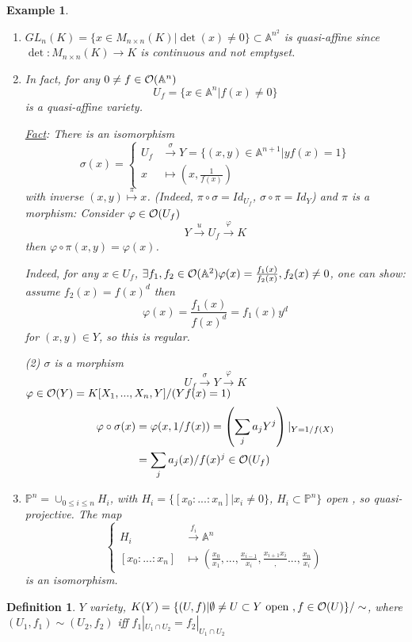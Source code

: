 \documentclass[11pt]{article}
\newtheorem{dfn}[thm]{Definition}
\newtheorem{ex}[thm]{Example}
\newcommand{\affn}{\mathbb A}
\newcommand{\proj}{\mathbb P}
\newcommand{\calo}{{\cal O}}
\newcommand{\lrta}{\longrightarrow}
\begin{document}
\begin{ex}\ 
\begin{enumerate}
\item $GL_n(K)=\{x\in M_{n\times n}(K)|\det(x)\neq 0\}\subset \affn^{n^2}$ is quasi-affine since $\det:M_{n\times n}(K)\lrta K$ is continuous and not emptyset.

\item In fact, for any $0\neq f\in \calo(\affn^n)$
$$
U_f=\{x\in \affn^n|f(x)\neq 0\}
$$
is a quasi-affine variety.

\underline{Fact}: There is an isomorphism
$$
\sigma(x) = 
\left\{\begin{aligned}
U_f&\overset{\sigma}{\lrta} Y=\{(x,y)\in\affn^{n+1}|yf(x)=1\}\\
x&\longmapsto \left(x,\frac{1}{f(x)}\right)
\end{aligned}
\right.
$$
with inverse
$(x,y)\overset{\pi}{\longmapsto}x$.
(Indeed, $\pi\circ \sigma=Id_{U_f}$, $\sigma\circ \pi=Id_Y$) and $\pi$ is a morphism: Consider $\varphi\in\calo(U_f)$
$$
Y\overset{u}{\lrta}U_f\overset{\varphi}{\lrta}K
$$
then $\varphi\circ \pi(x,y)=\varphi(x)$.

Indeed, for any $x\in U_f$, $\exists f_1,f_2\in \calo(\affn^2)\varphi(x)=\frac{f_1(x)}{f_2(x)}, f_2(x)\neq 0$, one can show: assume $f_2(x)=f(x)^d$ then 
$$
\varphi(x)=\frac{f_1(x)}{f(x)^d}=f_1(x)y^d
$$
for $(x,y)\in Y$, so this is regular.

(2) $\sigma$ is a morphism
$$
U_f\overset{\sigma}{\lrta}Y\overset{\varphi}{\lrta}K
$$
$\varphi\in\calo(Y)=K[X_1,...,X_n,Y]/(Yf(x)=1)$
$$
\begin{aligned}
\varphi\circ \sigma(x)&=\varphi(x,1/f(x))=\left(\sum_j a_j Y^j\right)|_{Y=1/f(X)}\\
&=\sum_j a_j (x)/f(x)^j\in \calo(U_f)
\end{aligned}
$$
\item $\proj^n=\cup_{0\leq i\leq n}H_i$, with $H_i=\{[x_0:...:x_n]|x_{i}\neq 0\}$, $H_i\subset \proj^n\}$ open , so quasi-projective. The map
$$
\left\{\begin{aligned}
H_i&\overset{f_i}{\lrta} \affn^n\\
[x_0:...:x_n]&\longmapsto (\frac{x_0}{x_1},...,\frac{x_{i-1}}{x_i},\frac{x_{i+1}{x_i}},...,\frac{x_n}{x_i})
\end{aligned}
\right.
$$
is an isomorphism.
\end{enumerate}
\end{ex}

\begin{dfn}
$Y$ variety, $K(Y)=\{(U,f)|\emptyset\neq U\subset Y\text{ open },f\in \calo(U)\}/\sim$, where $(U_1,f_1)\sim (U_2,f_2)$ iff $f_1|_{U_1\cap U_2}=f_2|_{U_1\cap U_2}$
\end{dfn}
\end{document}

